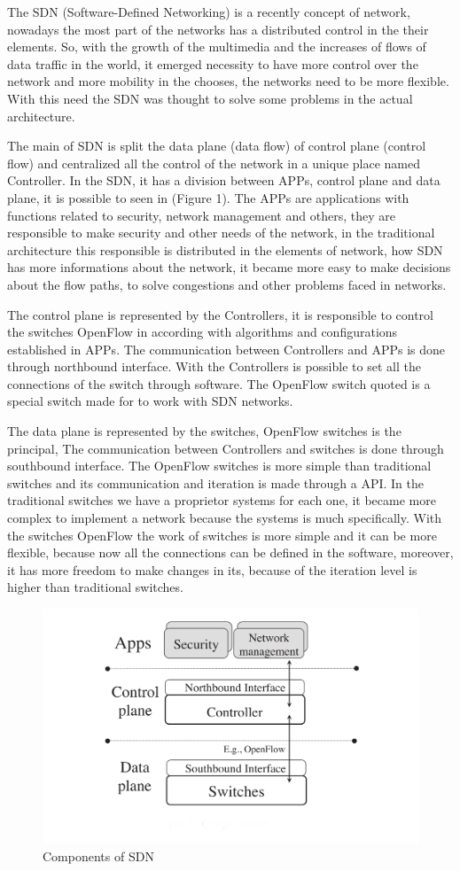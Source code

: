 \documentclass[12pt]{article}
\begin{document}
The SDN (Software-Defined Networking) is a recently concept of network, nowadays the most part of the networks has a distributed control in the their elements. So, with the growth of the multimedia and the increases of flows of data traffic in the world, it emerged necessity to have more control over the network and more mobility in the chooses, the networks need to be more flexible. With this need the SDN was thought to solve some problems in the actual architecture.

The main of SDN is split the data plane (data flow) of control plane (control flow) and centralized all the control of the network in a unique place named Controller. In the SDN, it has a division between APPs, control plane and data plane, it is possible to seen in (Figure 1). The APPs are applications with functions related to security, network management and others, they are responsible to make security and other needs of the network, in the traditional architecture this responsible is distributed in the elements of network, how SDN has more informations about the network, it became more easy to make decisions about the flow paths, to solve congestions and other problems faced in networks.

The control plane is represented by the Controllers, it is responsible to control the switches OpenFlow in according with algorithms and configurations established in APPs. The communication between Controllers and APPs is done through northbound interface. With the Controllers is possible to set all the connections of the switch through software. The OpenFlow switch quoted is a special switch made for to work with SDN networks.

The data plane is represented by the switches, OpenFlow switches is the principal, The communication between Controllers and switches is done through southbound interface. The OpenFlow switches is more simple than traditional switches and its communication and iteration is made through a API. In the traditional switches we have a proprietor systems for each one, it became more complex to implement a network because the systems is much specifically. With the switches OpenFlow the work of switches is more simple and it can be more flexible, because now all the connections can be defined in the software, moreover, it has more freedom to make changes in its, because of the iteration level is higher than traditional switches.

\begin{figure}[ht]
\centering
\includegraphics[width=.7\textwidth]{figure1.png}
\caption{Components of SDN}
\label{figure1}
\end{figure}
\end{document}
